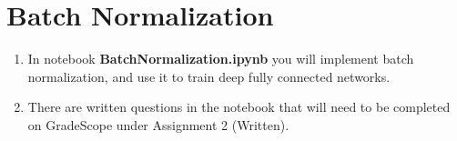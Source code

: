 \section{Batch Normalization}

\begin{enumerate}
    \item {} In notebook \textbf{BatchNormalization.ipynb} you will implement batch normalization, and use it to train deep fully connected networks.
    \item {} There are written questions in the notebook that will need to be completed on GradeScope under Assignment 2 (Written).
\end{enumerate}


